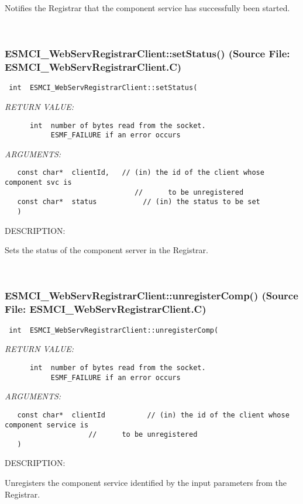      Notifies the Registrar that the component service has successfully
      been started.
   
 
\mbox{}\hrulefill\
 
\subsubsection{ESMCI\_WebServRegistrarClient::setStatus() (Source File: ESMCI\_WebServRegistrarClient.C)}


  
\begin{verbatim} int  ESMCI_WebServRegistrarClient::setStatus(\end{verbatim}{\em RETURN VALUE:}
\begin{verbatim}      int  number of bytes read from the socket.
           ESMF_FAILURE if an error occurs\end{verbatim}{\em ARGUMENTS:}
\begin{verbatim}   const char*  clientId,   // (in) the id of the client whose component svc is
                               //      to be unregistered
   const char*  status           // (in) the status to be set
   )\end{verbatim}
{\sf DESCRIPTION:\\ }


      Sets the status of the component server in the Registrar.
   
 
\mbox{}\hrulefill\
 
\subsubsection{ESMCI\_WebServRegistrarClient::unregisterComp() (Source File: ESMCI\_WebServRegistrarClient.C)}


  
\begin{verbatim} int  ESMCI_WebServRegistrarClient::unregisterComp(\end{verbatim}{\em RETURN VALUE:}
\begin{verbatim}      int  number of bytes read from the socket.
           ESMF_FAILURE if an error occurs\end{verbatim}{\em ARGUMENTS:}
\begin{verbatim}   const char*  clientId          // (in) the id of the client whose component service is
                    //      to be unregistered
   )\end{verbatim}
{\sf DESCRIPTION:\\ }


      Unregisters the component service identified by the input parameters
      from the Registrar.
  
\setlength{\parskip}{\oldparskip}
\setlength{\parindent}{\oldparindent}
\setlength{\baselineskip}{\oldbaselineskip}
